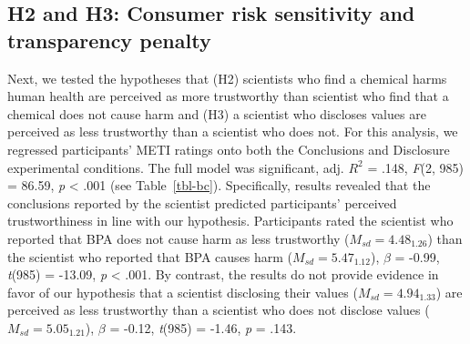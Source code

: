 \documentclass[
  letterpaper,
  DIV=11,
  numbers=noendperiod]{scrartcl}
\begin{document}
\hypertarget{h2-and-h3-consumer-risk-sensitivity-and-transparency-penalty}{%
\subsection{H2 and H3: Consumer risk sensitivity and transparency
penalty}\label{h2-and-h3-consumer-risk-sensitivity-and-transparency-penalty}}

Next, we tested the hypotheses that (H2) scientists who find a chemical
harms human health are perceived as more trustworthy than scientist who
find that a chemical does not cause harm and (H3) a scientist who
discloses values are perceived as less trustworthy than a scientist who
does not. For this analysis, we regressed participants' METI ratings
onto both the Conclusions and Disclosure experimental conditions. The
full model was significant, adj. \(R^2\) = .148, \emph{F}(2, 985) =
86.59, \emph{p} \textless{} .001 (see Table~\ref{tbl-bc}). Specifically,
results revealed that the conclusions reported by the scientist
predicted participants' perceived trustworthiness in line with our
hypothesis. Participants rated the scientist who reported that BPA does
not cause harm as less trustworthy (\(M_{sd} = 4.48_{1.26}\)) than the
scientist who reported that BPA causes harm (\(M_{sd} = 5.47_{1.12}\)),
\(\beta\) = -0.99, \emph{t}(985) = -13.09, \emph{p} \textless{} .001. By
contrast, the results do not provide evidence in favor of our hypothesis
that a scientist disclosing their values (\(M_{sd} = 4.94_{1.33}\)) are
perceived as less trustworthy than a scientist who does not disclose
values (\(M_{sd} = 5.05_{1.21}\)), \(\beta\) = -0.12, \emph{t}(985) =
-1.46, \emph{p} = .143.
\end{document}
